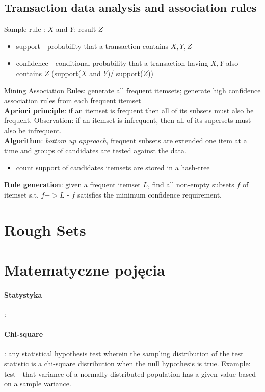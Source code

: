 \documentclass[10pt,a4paper]{article}
\begin{document}
\subsection{Transaction data analysis and association rules}
Sample rule : $X$ and $Y$; result $Z$
  \begin{itemize}
    \item support - probability that a transaction contains $X, Y, Z$
    \item confidence - conditional probability that a transaction having $X, Y$ also contains $Z$ (support($X$ and $Y$)$/$ support($Z$))
  \end{itemize}
Mining Association Rules: generate all frequent itemsets; generate high confidence association rules from each frequent itemset \\
\textbf{Apriori principle}: if an itemset is frequent then all of its subsets must also be frequent. Observation: if an itemset is infrequent, then all of its supersets must also be infrequent. \\
\textbf{Algorithm}: \textit{bottom up approach}, frequent subsets are extended one item at a time and groups of candidates are tested against the data. \\
\begin{itemize}
    \item count support of candidates itemsets are stored in a hash-tree
\end{itemize}
\textbf{Rule generation}: given a frequent itemset $L$, find all non-empty subsets $f$ of itemset s.t. $f -> L$ - $f$ satisfies the minimum confidence requirement.
\section{Rough Sets}
\section{Matematyczne pojęcia}
\paragraph{Statystyka} : %
\paragraph{Chi-square} : any statistical hypothesis test wherein the sampling distribution of the test statistic is a chi-square distribution when the null hypothesis is true. Example: test - that variance of a normally distributed population has a given value based on a sample variance. \\
\end{document}
